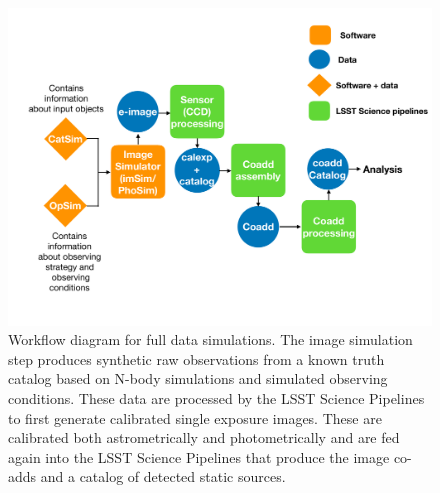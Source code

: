 \documentclass[a4paper,fleqn,usenatbib]{mnras}
\begin{document}
\begin{figure}
\centering
 \includegraphics[trim={0cm 1.5cm 0cm 1.05cm}, clip, width=1.0\columnwidth]{dc1_workflow}
\caption{Workflow diagram for full data simulations. The image simulation step produces synthetic raw observations from a known truth catalog based on N-body simulations and simulated observing conditions. These data are processed by the LSST Science Pipelines to first generate calibrated single exposure images. These are calibrated both astrometrically and photometrically and are fed again into the LSST Science Pipelines that produce the image co-adds and a catalog of detected static sources. 
}

\label{fig:dc1_workflow}
\end{figure}
\end{document}
